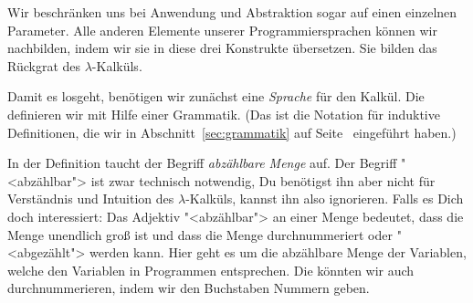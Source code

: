 Wir beschränken uns bei Anwendung und Abstraktion sogar auf einen
einzelnen Parameter.  Alle
anderen Elemente unserer Programmiersprachen können wir nachbilden,
indem wir sie in diese drei Konstrukte übersetzen.  Sie
bilden das Rückgrat des $\lambda$-Kalküls.

Damit es losgeht, benötigen wir zunächst eine \textit{Sprache} für den
Kalkül. Die definieren wir mit Hilfe einer Grammatik.  (Das ist
die Notation für induktive Definitionen, die wir in
Abschnitt~\ref{sec:grammatik} auf Seite~\pageref{sec:grammatik}
eingeführt haben.)

In der Definition taucht der Begriff \textit{abzählbare
  Menge} auf.  Der Begriff "<abzählbar"> ist
zwar technisch notwendig, Du benötigst ihn aber nicht für Verständnis
und Intuition des $\lambda$-Kalküls, kannst ihn also ignorieren.
Falls es Dich doch interessiert: Das Adjektiv "<abzählbar"> an
einer Menge bedeutet, dass die Menge unendlich groß ist und dass die
Menge durchnummeriert oder "<abgezählt"> werden kann.  Hier geht es um
die abzählbare Menge der Variablen, welche den Variablen in Programmen
entsprechen.  Die könnten wir auch durchnummerieren, indem wir den
Buchstaben Nummern geben.

